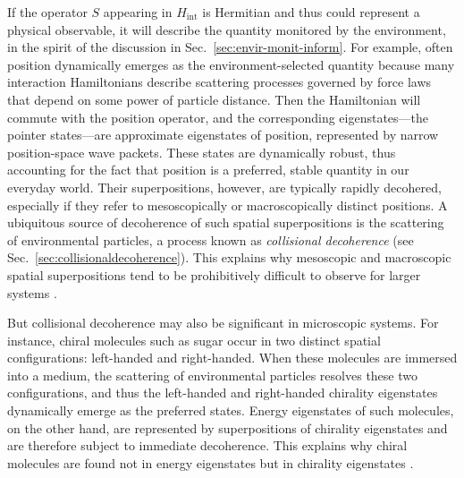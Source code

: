 \documentclass[3p,sort&compress,12pt]{elsarticle}
\newcommand{\op}[1]{#1}
\begin{document}
If the operator $\op{S}$ appearing in $\op{H}_\text{int}$ is Hermitian and thus could represent a physical observable, it will describe the quantity monitored by the environment, in the spirit of the discussion in Sec.~\ref{sec:envir-monit-inform}. For example, often position dynamically emerges as the environment-selected quantity because many interaction Hamiltonians describe scattering processes governed by force laws that depend on some power of particle distance. Then the Hamiltonian will commute with the position operator, and the corresponding eigenstates---the pointer states---are approximate eigenstates of position, represented by narrow position-space wave packets. These states are dynamically robust, thus accounting for the fact that position is a preferred, stable quantity in our everyday world. Their superpositions, however, are typically rapidly decohered, especially if they refer to mesoscopically or macroscopically distinct positions. A ubiquitous source of decoherence of such spatial superpositions is the scattering of environmental particles, a process known as \emph{collisional decoherence} (see Sec.~\ref{sec:collisionaldecoherence}). This explains why mesoscopic and macroscopic spatial superpositions tend to be prohibitively difficult to observe for larger systems \cite{Zurek:1981:dd,Zurek:1982:tv,Joos:1985:iu,Zurek:1991:vv,Gallis:1990:un,Diosi:1995:um,Hornberger:2003:un,Hornberger:2006:tb,Hornberger:2008:ii,Busse:2009:aa,Busse:2010:aa}. 

But collisional decoherence may also be significant in microscopic systems. For instance, chiral molecules such as sugar occur in two distinct spatial configurations: left-handed and right-handed. When these molecules are immersed into a medium, the scattering of environmental particles resolves these two configurations, and thus the left-handed and right-handed chirality eigenstates dynamically emerge as the preferred states. Energy eigenstates of such molecules, on the other hand, are represented by superpositions of chirality eigenstates and are therefore subject to immediate decoherence. This explains why chiral molecules are found not in energy eigenstates but in chirality eigenstates \cite{Harris:1981:rc,Zeh:1999:qr,Trost:2009:ll,Bahrami:2012:oo}. 
\end{document}
